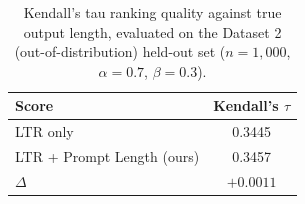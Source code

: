 \begin{table}[t]
    \centering
    \caption{Kendall's tau ranking quality against true output length,
    evaluated on the Dataset 2 (out-of-distribution) held-out set
    ($n=1{,}000$, $\alpha=0.7$, $\beta=0.3$).}
    \label{tab:kendalls_tau}
    \begin{tabular}{@{}lc@{}}
        \toprule
        Score & Kendall's $\tau$ \\
        \midrule
        LTR only                   & 0.3445 \\
        LTR + Prompt Length (ours) & 0.3457 \\
        \midrule
        $\Delta$                   & $+0.0011$ \\
        \bottomrule
    \end{tabular}
\end{table}
